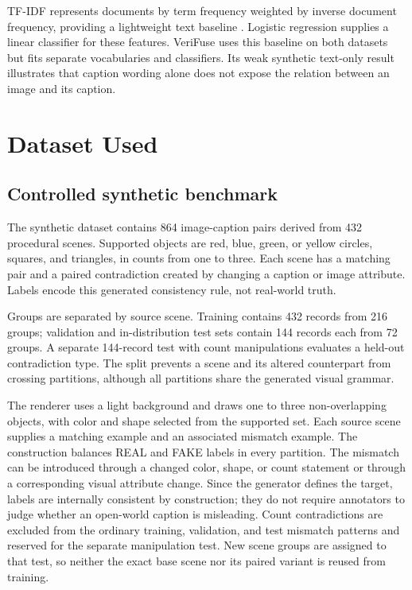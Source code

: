 \documentclass[conference]{IEEEtran}
\begin{document}
TF-IDF represents documents by term frequency weighted by inverse document frequency, providing a lightweight text baseline \cite{salton}. Logistic regression supplies a linear classifier for these features. VeriFuse uses this baseline on both datasets but fits separate vocabularies and classifiers. Its weak synthetic text-only result illustrates that caption wording alone does not expose the relation between an image and its caption.
\section{Dataset Used}
\subsection{Controlled synthetic benchmark}
The synthetic dataset contains 864 image-caption pairs derived from 432 procedural scenes. Supported objects are red, blue, green, or yellow circles, squares, and triangles, in counts from one to three. Each scene has a matching pair and a paired contradiction created by changing a caption or image attribute. Labels encode this generated consistency rule, not real-world truth.

Groups are separated by source scene. Training contains 432 records from 216 groups; validation and in-distribution test sets contain 144 records each from 72 groups. A separate 144-record test with count manipulations evaluates a held-out contradiction type. The split prevents a scene and its altered counterpart from crossing partitions, although all partitions share the generated visual grammar.

The renderer uses a light background and draws one to three non-overlapping objects, with color and shape selected from the supported set. Each source scene supplies a matching example and an associated mismatch example. The construction balances REAL and FAKE labels in every partition. The mismatch can be introduced through a changed color, shape, or count statement or through a corresponding visual attribute change. Since the generator defines the target, labels are internally consistent by construction; they do not require annotators to judge whether an open-world caption is misleading. Count contradictions are excluded from the ordinary training, validation, and test mismatch patterns and reserved for the separate manipulation test. New scene groups are assigned to that test, so neither the exact base scene nor its paired variant is reused from training.
\end{document}
